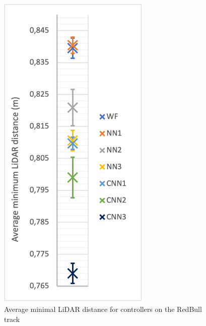 \begin{figure}
\begin{minipage}{0.45\textwidth}
        \includegraphics[width=0.65\textwidth]{Figures/H1_LiDAR.png}
        \caption{Average minimal LiDAR distance for controllers on the RedBull track}
        \label{h1_lidar}
    \end{minipage}
\end{figure}

